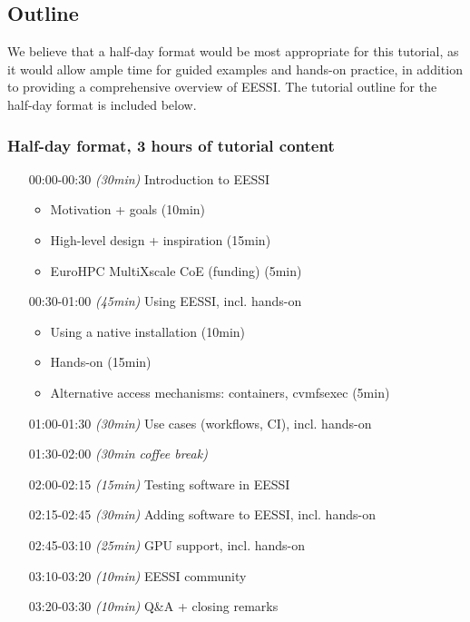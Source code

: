 \subsection*{Outline}

We believe that a half-day format would be most appropriate for this tutorial, as it would allow ample time for guided
examples and hands-on practice, in addition to providing a comprehensive overview of EESSI. The tutorial outline for the half-day format is included below.


\subsubsection*{Half-day format, 3 hours of tutorial content}

\begin{itemize}[style=standard, labelwidth=1.9cm]


    \item [00:00-00:30] \emph{(30min)} Introduction to EESSI
     \begin{itemize}
         \item Motivation + goals (10min)
         \item High-level design + inspiration (15min)
         \item EuroHPC MultiXscale CoE (funding) (5min)
     \end{itemize}
    \item [00:30-01:00] \emph{(45min)} Using EESSI, incl. hands-on
     \begin{itemize}
         \item Using a native installation (10min)
         \item Hands-on (15min)
         \item Alternative access mechanisms: containers, cvmfsexec (5min)
     \end{itemize}
    \item [01:00-01:30] \emph{(30min)} Use cases (workflows, CI), incl. hands-on
    \item [01:30-02:00] \emph{(30min coffee break)}
    \item [02:00-02:15] \emph{(15min)} Testing software in EESSI  %
    \item [02:15-02:45] \emph{(30min)} Adding software to EESSI, incl. hands-on
    \item [02:45-03:10] \emph{(25min)} GPU support, incl. hands-on
    \item [03:10-03:20] \emph{(10min)} EESSI community
    \item [03:20-03:30] \emph{(10min)} Q\&A + closing remarks

\end{itemize}
